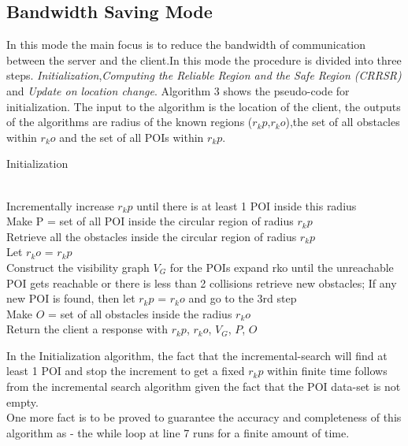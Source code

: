 \documentclass{sig-alternate}
\begin{document}
\subsection{Bandwidth Saving Mode}
In this mode the main focus is to reduce the bandwidth of communication between the server and the client.In this mode the procedure is divided into three steps. \textit{Initialization},\textit{Computing the Reliable Region and the Safe Region (CRRSR)} and \textit{Update on location change}. Algorithm 3 shows the pseudo-code for initialization. The input to the algorithm is the location of the client, the outputs of the algorithms are radius of the known regions ($r_kp$,$r_ko$),the set of all obstacles within $r_ko$ and the set of all POIs within $r_kp$.
\begin{algorithm}
\caption{Initialization}
\label{Init}
\begin{algorithmic}[1]

\\Incrementally increase $r_kp$ until there is at least 1 POI inside this radius
\\Make P = {set of all POI inside the circular region of radius $r_kp$}
\\Retrieve all the obstacles inside the circular region of radius $r_kp$
\\Let $r_ko$ = $r_kp$
\\Construct the visibility graph $V_G$ for the POIs
\State expand rko  until the unreachable POI gets reachable or there is less than 2 collisions
\State retrieve new obstacles;
\State If any new POI is found, then let $r_kp$ = $r_ko$ and go to the 3rd step
\EndWhile
\\Make $O$ = {set of all obstacles inside the radius $r_ko$}
\\Return the client a response with  $r_kp$, $r_ko$, $V_G$, $P$, $O$ 

\EndProcedure
\end{algorithmic}
\end{algorithm}


In the Initialization algorithm, the fact that the incremental-search will find at least 1 POI and stop the increment to get a fixed $r_kp$ within finite time follows from the incremental search algorithm given the fact that the POI data-set is not empty.
\\One more fact is to be proved to guarantee the accuracy and completeness of this algorithm as - the while loop at line 7 runs for a finite amount of time.
\end{document}
